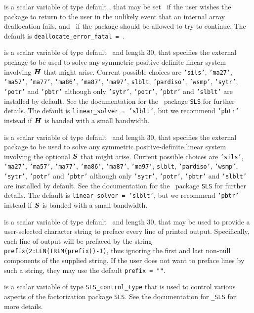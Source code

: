\documentclass{galahad}
\begin{document}
\begin{description}
 is a scalar variable of type default \logical,
that may be set \true\ if the user wishes the package to return to the user
in the unlikely event that an internal array deallocation fails,
and \false\ if the package should be allowed to try to continue.
The default is {\tt deallocate\_error\_fatal = \false}.

 is a scalar variable of type default \character\
and length 30, that specifies the external package to be used to
solve any symmetric positive-definite linear system involving ${\bm{H}}$ 
that might arise. Current possible
choices are {\tt 'sils'}, {\tt 'ma27'}, {\tt 'ma57'}, {\tt 'ma77'},
{\tt 'ma86'}, {\tt 'ma87'}, {\tt 'ma97'}, {\tt slblt}, {\tt 'pardiso'},
{\tt 'wsmp'}, {\tt 'sytr'}, {\tt 'potr'} and {\tt 'pbtr'}
although only {\tt 'sytr'}, {\tt 'potr'}, {\tt 'pbtr'} and {\tt 'slblt'} are installed by default.
See the documentation for the \galahad\ package {\tt SLS} for further details.
The default is {\tt linear\_solver = 'slblt'}, but we recommend
{\tt 'pbtr'} instead if ${\bm{H}}$ is banded with a small bandwidth.

 is a scalar variable of type default \character\
and length 30, that specifies the external package to be used to
solve any symmetric positive-definite linear system involving the optional
${\bm{S}}$ that might arise. Current possible
choices are {\tt 'sils'}, {\tt 'ma27'}, {\tt 'ma57'}, {\tt 'ma77'},
{\tt 'ma86'}, {\tt 'ma87'}, {\tt 'ma97'}, {\tt slblt}, {\tt 'pardiso'},
{\tt 'wsmp'}, {\tt 'sytr'}, {\tt 'potr'} and {\tt 'pbtr'}
although only {\tt 'sytr'}, {\tt 'potr'}, {\tt 'pbtr'} and {\tt 'slblt'} are installed by default.
See the documentation for the \galahad\ package {\tt SLS} for further details.
The default is {\tt linear\_solver = 'slblt'}, but we recommend
{\tt 'pbtr'} instead if ${\bm{S}}$ is banded with a small bandwidth.

\itt{prefix} is a scalar variable of type default \character\
and length 30, that may be used to provide a user-selected
character string to preface every line of printed output.
Specifically, each line of output will be prefaced by the string
{\tt prefix(2:LEN(TRIM(prefix))-1)},
thus ignoring the first and last non-null components of the
supplied string. If the user does not want to preface lines by such
a string, they may use the default {\tt prefix = ""}.

\itt{SLS\_control} is a scalar variable of type
{\tt SLS\_control\_type} that is used to control various aspects of the
factorization package {\tt SLS}. See the documentation for
{\tt \libraryname\_SLS} for more details.


\end{description}
\end{document}
